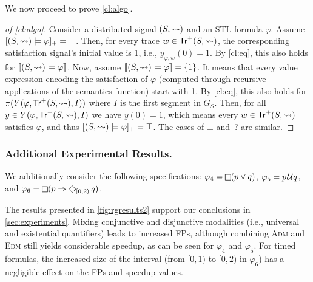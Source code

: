 We now proceed to prove \cref{cl:algo}.

\begin{proof}[of \cref{cl:algo}]
	Consider a distributed signal $(S,{\rightsquigarrow})$ and an STL formula $\varphi$.
	Assume $[(S,{\rightsquigarrow}) \models \varphi]_+ = \top$.
	Then, for every trace $w \in \mathsf{Tr}^+(S,{\rightsquigarrow})$, the corresponding satisfaction signal's initial value is 1, i.e., $y_{\varphi,w}(0) = 1$.
	By \cref{cl:eq}, this also holds for $\llbracket (S, {\rightsquigarrow}) \models \varphi \rrbracket$.
	Now, assume  $\llbracket (S, {\rightsquigarrow}) \models \varphi \rrbracket = \{1\}$.
	It means that every value expression encoding the satisfaction of $\varphi$ (computed through recursive applications of the semantics function) start with 1.
	By \cref{cl:eq}, this also holds for $\pi(Y(\varphi, \mathsf{Tr}^+(S,{\rightsquigarrow}), I))$ where $I$ is the first segment in $G_S$.
	Then, for all $y \in Y(\varphi, \mathsf{Tr}^+(S,{\rightsquigarrow}), I)$ we have $y(0) = 1$, which means every $w \in \mathsf{Tr}^+(S,{\rightsquigarrow})$ satisfies $\varphi$, and thus $[(S,{\rightsquigarrow}) \models \varphi]_+ = \top$.
	The cases of $\bot$ and ${\,?}$ are similar.
%
\end{proof}

\subsubsection{Additional Experimental Results.}

We additionally consider the following specifications:
$\varphi_4 = \LTLg (p \lor q)$, $\varphi_5 = p \kern.1em\mathcal{U} q$, and $\varphi_6 = \LTLg (p \Rightarrow \LTLf_{[0,2)} q)$.

The results presented in \cref{fig:rgresults2} support our conclusions in \cref{sec:experiments}.
Mixing conjunctive and disjunctive modalities (i.e., universal and existential quantifiers) leads to increased FPs, although combining \textsc{Adm} and \textsc{Edm} still yields considerable speedup, as can be seen for $\varphi_4$ and $\varphi_5$.
For timed formulas, the increased size of the interval (from $[0,1)$ to $[0,2)$ in $\varphi_6$) has a negligible effect on the FPs and speedup values.

